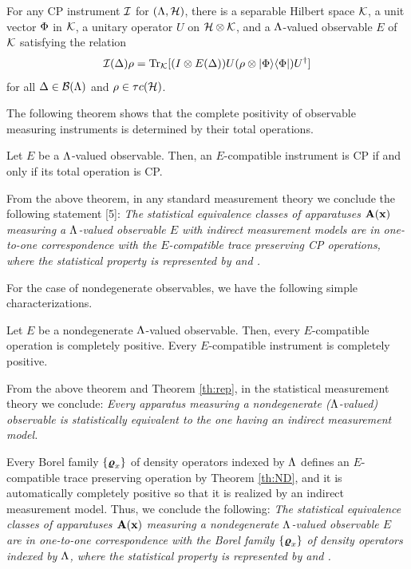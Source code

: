 \begin{Theorem}\label{th:rep}
For any CP instrument ${\cal I}$ for $(\Lambda,{\cal H})$,
there is a separable Hilbert space ${\cal K}$,
a unit vector $\Phi$ in ${\cal K}$, 
a unitary operator $U$ on ${\cal H}\otimes{\cal K}$,
and a $\Lambda$-valued observable $E$ of ${\cal K}$
satisfying the relation
$$
{\cal I}(\Delta)\rho
=\mbox{\rm Tr}_{{\cal K}}[(I\otimes E(\Delta))U(\rho\otimes|\Phi\rangle\langle\Phi|)U^{\dagger}]
$$
for all $\Delta\in{\cal B}(\Lambda)$ and $\rho\in\tau c({\cal H})$.
\end{Theorem}

The following theorem shows that the complete positivity of observable
measuring instruments is determined by their total operations.

\begin{Theorem}\label{th:A-COMP-CP}
Let $E$ be a $\Lambda$-valued observable.
Then, an $E$-compatible instrument is CP 
if and only if its total operation is CP.
\end{Theorem}

From the above theorem, in any standard measurement theory
we conclude the following statement [5]:
{\em The statistical equivalence classes of apparatuses ${\bf A}({\bf x})$ 
measuring a $\Lambda$-valued observable $E$ with indirect measurement 
models are in one-to-one correspondence with the $E$-compatible 
trace preserving CP operations,
where the statistical property is represented by  
and .}

For the case of nondegenerate observables, we have the following
simple characterizations.

\begin{Theorem}
Let $E$ be a nondegenerate $\Lambda$-valued observable.  Then, every
$E$-compatible operation is completely positive.  
Every $E$-compatible instrument is completely positive.
\end{Theorem}

From the above theorem and Theorem \ref{th:rep},
in the statistical measurement theory we conclude:
{\em Every apparatus measuring a nondegenerate ($\Lambda$-valued) 
observable is statistically equivalent to the one having 
an indirect measurement model.}

\sloppy
Every Borel family $\{\mbox{\boldmath{$\varrho$}}_{x}\}$ of density operators indexed by
$\Lambda$ defines an $E$-compatible trace preserving operation
by Theorem \ref{th:ND},
and it is automatically completely positive so that it is
realized by an indirect measurement model.
Thus, we conclude the following:
{\em   The statistical equivalence classes of apparatuses ${\bf A}({\bf x})$ 
measuring a nondegenerate $\Lambda$-valued observable $E$ are in one-to-one
correspondence with the Borel family $\{\mbox{\boldmath{$\varrho$}}_{x}\}$ of density operators
indexed by $\Lambda$,
where the statistical property is represented by  and 
.}


